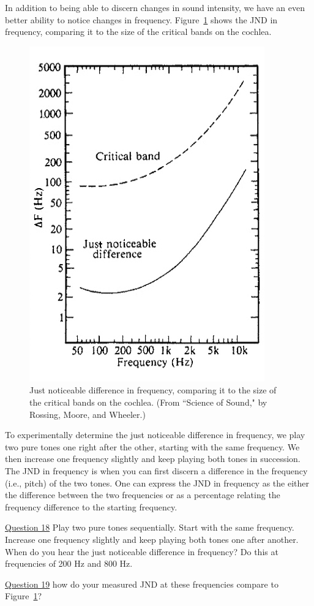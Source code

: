 \documentclass[11pt]{NSF}
\begin{document}
In addition to being able to discern changes in sound intensity, 
we have an even better ability to notice changes in frequency. 
Figure~\ref{f:jnd_pitch} shows the JND in frequency, comparing 
it to the size of the critical bands on the cochlea.
%
\begin{figure}[hbtp]
\begin{center}
\includegraphics[width=.4\textwidth]{freqJNDa.jpg}
\caption{Just noticeable difference in frequency,
comparing it to the size of the critical bands on the cochlea.
(From ``Science of Sound," by Rossing, Moore, and Wheeler.)}
\label{f:jnd_pitch}
\end{center}
\end{figure}
%

To experimentally determine the just noticeable difference in
frequency, we play two pure tones one right after the other,
starting with the same frequency. 
We then increase one frequency slightly and keep playing both tones 
in succession.
The JND in frequency is when you can first discern a difference in 
the frequency (i.e., pitch) of the two tones.
One can express the JND in frequency as the either the 
difference between the two frequencies or as a percentage relating
the frequency difference to the starting frequency.

\underline{Question 18} Play two pure tones sequentially. Start with the same frequency. Increase one frequency
slightly and keep playing both tones one after another. When do you hear the just noticeable
difference in frequency? Do this at frequencies of 200 Hz and 800 Hz.

\underline{Question 19} how do your measured JND at these frequencies compare to Figure~\ref{f:jnd_pitch}?
\end{document}
